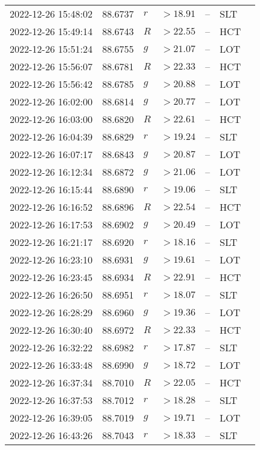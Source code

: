 \documentclass{nature_plusfigure}
\begin{document}
\begin{supplement}
\begin{center}
\begin{longtable}{lllllll}
2022-12-26 15:48:02 & 88.6737 & $r$ & $>18.91$ & -- & SLT &  \\ 
2022-12-26 15:49:14 & 88.6743 & $R$ & $>22.55$ & -- & HCT &  \\ 
2022-12-26 15:51:24 & 88.6755 & $g$ & $>21.07$ & -- & LOT &  \\ 
2022-12-26 15:56:07 & 88.6781 & $R$ & $>22.33$ & -- & HCT &  \\ 
2022-12-26 15:56:42 & 88.6785 & $g$ & $>20.88$ & -- & LOT &  \\ 
2022-12-26 16:02:00 & 88.6814 & $g$ & $>20.77$ & -- & LOT &  \\ 
2022-12-26 16:03:00 & 88.6820 & $R$ & $>22.61$ & -- & HCT &  \\ 
2022-12-26 16:04:39 & 88.6829 & $r$ & $>19.24$ & -- & SLT &  \\ 
2022-12-26 16:07:17 & 88.6843 & $g$ & $>20.87$ & -- & LOT &  \\ 
2022-12-26 16:12:34 & 88.6872 & $g$ & $>21.06$ & -- & LOT &  \\ 
2022-12-26 16:15:44 & 88.6890 & $r$ & $>19.06$ & -- & SLT &  \\ 
2022-12-26 16:16:52 & 88.6896 & $R$ & $>22.54$ & -- & HCT &  \\ 
2022-12-26 16:17:53 & 88.6902 & $g$ & $>20.49$ & -- & LOT &  \\ 
2022-12-26 16:21:17 & 88.6920 & $r$ & $>18.16$ & -- & SLT &  \\ 
2022-12-26 16:23:10 & 88.6931 & $g$ & $>19.61$ & -- & LOT &  \\ 
2022-12-26 16:23:45 & 88.6934 & $R$ & $>22.91$ & -- & HCT &  \\ 
2022-12-26 16:26:50 & 88.6951 & $r$ & $>18.07$ & -- & SLT &  \\ 
2022-12-26 16:28:29 & 88.6960 & $g$ & $>19.36$ & -- & LOT &  \\ 
2022-12-26 16:30:40 & 88.6972 & $R$ & $>22.33$ & -- & HCT &  \\ 
2022-12-26 16:32:22 & 88.6982 & $r$ & $>17.87$ & -- & SLT &  \\ 
2022-12-26 16:33:48 & 88.6990 & $g$ & $>18.72$ & -- & LOT &  \\ 
2022-12-26 16:37:34 & 88.7010 & $R$ & $>22.05$ & -- & HCT &  \\ 
2022-12-26 16:37:53 & 88.7012 & $r$ & $>18.28$ & -- & SLT &  \\ 
2022-12-26 16:39:05 & 88.7019 & $g$ & $>19.71$ & -- & LOT &  \\ 
2022-12-26 16:43:26 & 88.7043 & $r$ & $>18.33$ & -- & SLT &  \\ 

\end{longtable}
\end{center}
\end{supplement}
\end{document}
